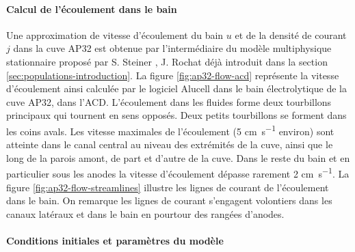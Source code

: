 \paragraph{Calcul de l'écoulement dans le bain} Une approximation de vitesse
d'écoulement du bain $u$ et de la densité de courant $j$ dans la cuve
AP32 est obtenue par l'intermédiaire du modèle multiphysique
stationnaire proposé par S. Steiner \cite{Steiner2009}, J. Rochat
\cite{Rochat2016} déjà introduit dans la section
\ref{sec:populations-introduction}. La figure \ref{fig:ap32-flow-acd}
représente la vitesse d'écoulement ainsi calculée par le logiciel
Alucell dans le bain électrolytique de la cuve AP32, dans
l'ACD. L'écoulement dans les fluides forme deux tourbillons principaux
qui tournent en sens opposés. Deux petits tourbillons se forment dans
les coins avals. Les vitesse maximales de l'écoulement (\num{5}
\si{\centi\meter\per\second} environ) sont atteinte dans le canal
central au niveau des extrémités de la cuve, ainsi que le long de la
parois amont, de part et d'autre de la cuve. Dans le reste du bain et
en particulier sous les anodes la vitesse d'écoulement dépasse
rarement \num{2} \si{\centi\meter\per\second}. La figure
\ref{fig:ap32-flow-streamlines} illustre les lignes de courant de
l'écoulement dans le bain. On remarque les lignes de courant
s'engagent volontiers dans les canaux latéraux et dans le bain en
pourtour des rangées d'anodes.

\paragraph{Conditions initiales et paramètres du modèle}



